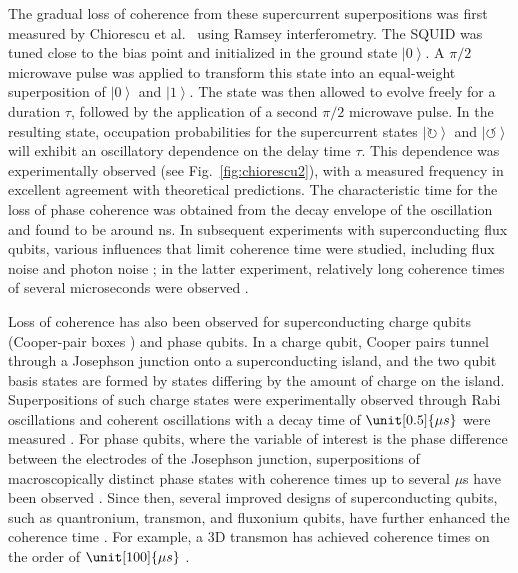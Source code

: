 \documentclass[3p,sort&compress,12pt]{elsarticle}
\newcommand{\ket}[1]{\left\vert{#1}\right\rangle}
\begin{document}
The gradual loss of coherence from these supercurrent superpositions was first measured by Chiorescu et al.\ \cite{Chiorescu:2003:ta} using Ramsey interferometry. The SQUID was tuned close to the bias point and initialized in the ground state $\ket{0}$. A $\pi/2$ microwave pulse was applied to transform this state into an equal-weight superposition of $\ket{0}$ and $\ket{1}$. The state was then allowed to evolve freely for a duration $\tau$, followed by the application of a second $\pi/2$ microwave pulse. In the resulting state, occupation probabilities for the supercurrent states $\ket{\circlearrowright}$ and $\ket{\circlearrowleft}$ will exhibit an oscillatory dependence on the delay time $\tau$. This dependence was experimentally observed (see Fig.~\ref{fig:chiorescu2}), with a measured frequency in excellent agreement with theoretical predictions. The characteristic time for the loss of phase coherence was obtained from the decay envelope of the oscillation and found to be around \unit[20]{ns}. In subsequent experiments with superconducting flux qubits, various influences that limit coherence time were studied, including flux noise \cite{Yoshihara:2006:ii,Bialczak:2007:uu} and photon noise \cite{Bertet:2005:un}; in the latter experiment, relatively long coherence times of several microseconds were observed \cite{Bertet:2005:un}. 

Loss of coherence has also been observed for superconducting charge qubits (Cooper-pair boxes \cite{Bouchiat:1998:ii}) and phase qubits. In a charge qubit, Cooper pairs tunnel through a Josephson junction onto a superconducting island, and the two qubit basis states are formed by states differing by the amount of charge on the island. Superpositions of such charge states were experimentally observed through Rabi oscillations \cite{Nakamura:1999:ub} and coherent oscillations with a decay time of $\unit[0.5]{\mu s}$ were measured \cite{Vion:2002:oo}. For phase qubits, where the variable of interest is the phase difference between the electrodes of the Josephson junction, superpositions of macroscopically distinct phase states with coherence times up to several $\mu$s have been observed \cite{Yu:2002:yb,Martinis:2002:qq}. Since then, several improved designs of superconducting qubits, such as quantronium, transmon, and fluxonium qubits, have further enhanced the coherence time \cite{Devoret:2013:pp}. For example, a 3D transmon has achieved coherence times on the order of $\unit[100]{\mu s}$ \cite{Rigetti:2012:aa,Sears:2012:ee}.
\end{document}
